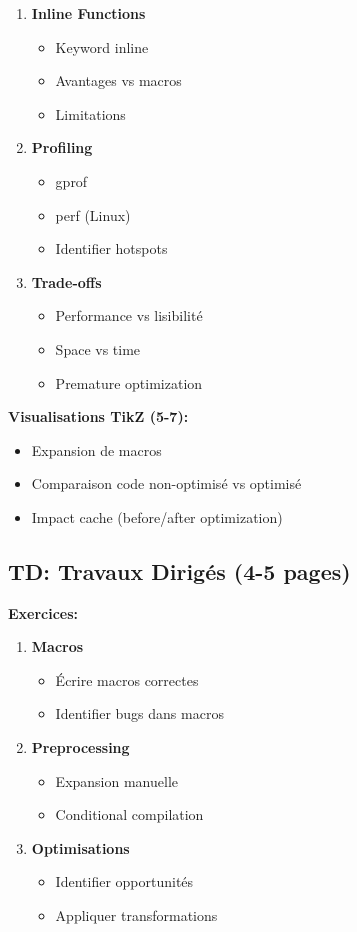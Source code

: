 \documentclass[10pt,a4paper]{article}
\begin{document}
\begin{enumerate}
\item \textbf{Inline Functions}
   \begin{itemize}
   \item Keyword inline
   \item Avantages vs macros
   \item Limitations
   \end{itemize}

\item \textbf{Profiling}
   \begin{itemize}
   \item gprof
   \item perf (Linux)
   \item Identifier hotspots
   \end{itemize}

\item \textbf{Trade-offs}
   \begin{itemize}
   \item Performance vs lisibilité
   \item Space vs time
   \item Premature optimization
   \end{itemize}
\end{enumerate}

\textbf{Visualisations TikZ (5-7):}
\begin{itemize}
\item Expansion de macros
\item Comparaison code non-optimisé vs optimisé
\item Impact cache (before/after optimization)
\end{itemize}

\subsection*{TD: Travaux Dirigés (4-5 pages)}

\textbf{Exercices:}
\begin{enumerate}
\item \textbf{Macros}
   \begin{itemize}
   \item Écrire macros correctes
   \item Identifier bugs dans macros
   \end{itemize}

\item \textbf{Preprocessing}
   \begin{itemize}
   \item Expansion manuelle
   \item Conditional compilation
   \end{itemize}

\item \textbf{Optimisations}
   \begin{itemize}
   \item Identifier opportunités
   \item Appliquer transformations
   \end{itemize}
\end{enumerate}
\end{document}
